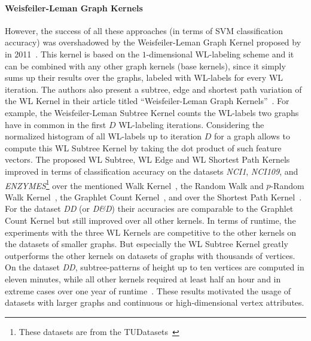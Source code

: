 		\paragraph{Weisfeiler-Leman Graph Kernels}
		However, the success of all these approaches (in terms of SVM classification accuracy) was overshadowed by the Weisfeiler-Leman Graph Kernel proposed by \citeauthor{2011_Shervashidze_JMLR} in 2011~\cite{2011_Shervashidze_JMLR}.
		This kernel is based on the $1$-dimensional WL-labeling scheme and it can be combined with any other graph kernels (base kernels), since it simply sums up their results over the graphs, labeled with WL-labels for every WL iteration. 
		The authors also present a subtree, edge and shortest path variation of the WL Kernel in their article titled \enquote{Weisfeiler-Leman Graph Kernels}~\cite{2011_Shervashidze_JMLR}. 
		For example, the Weisfeiler-Leman Subtree Kernel counts the WL-labels two graphs have in common in the first $D$ WL-labeling iterations.
		Considering the normalized histogram of all WL-labels up to iteration $D$ for a graph allows to compute this WL Subtree Kernel by taking the dot product of such feature vectors.
		The proposed WL Subtree, WL Edge and WL Shortest Path Kernels improved in terms of classification accuracy on the datasets \textit{NCI1}, \textit{NCI109}, and \textit{ENZYMES}\footnote{These datasets are from the TUDatasets~\cite{2016_Kersting_CONF, 2020_Morris_CONF}}\saveFN\fnname\; over the mentioned Walk Kernel~\cite{2003_Ramon_CONF}, the Random Walk and $p$-Random Walk Kernel~\cite{2010_Vishwanathan_CONF, 2003_Kashima_ICML}, the Graphlet Count Kernel~\cite{2009_Shervashidze_PMLR}, and over the Shortest Path Kernel~\cite{2005_Borgwardt_IEEE}.
		For the dataset \textit{DD} (or \textit{D\&D})\useFN\fnname\; their accuracies are comparable to the Graphlet Count Kernel but still improved over all other kernels.
		In terms of runtime, the experiments with the three WL Kernels are competitive to the other kernels on the datasets of smaller graphs.
		But especially the WL Subtree Kernel greatly outperforms the other kernels on datasets of graphs with thousands of vertices.
		On the dataset \textit{DD}\useFN\fnname, subtree-patterns of height up to ten vertices are computed in eleven minutes, while all other kernels required at least half an hour and in extreme cases over one year of runtime~\cite{2011_Shervashidze_JMLR}.
		These results motivated the usage of datasets with larger graphs and continuous or high-dimensional vertex attributes.
				
